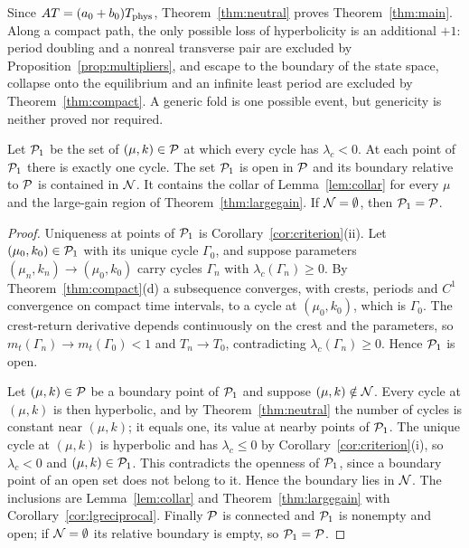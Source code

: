 Since $AT=(a_0+b_0)T_{\rm phys}$, Theorem~\ref{thm:neutral} proves Theorem~\ref{thm:main}. Along a compact path, the only possible loss of hyperbolicity is an additional $+1$: period doubling and a nonreal transverse pair are excluded by Proposition~\ref{prop:multipliers}, and escape to the boundary of the state space, collapse onto the equilibrium and an infinite least period are excluded by Theorem~\ref{thm:compact}. A generic fold is one possible event, but genericity is neither proved nor required.

\begin{corollary}\label{obs:cor:uniqueset}
Let $\mathcal P_1$ be the set of $(\mu,k)\in\mathcal P$ at which every cycle has $\lambda_c<0$. At each point of $\mathcal P_1$ there is exactly one cycle. The set $\mathcal P_1$ is open in $\mathcal P$ and its boundary relative to $\mathcal P$ is contained in $\mathcal N$. It contains the collar of Lemma~\ref{lem:collar} for every $\mu$ and the large-gain region of Theorem~\ref{thm:largegain}. If $\mathcal N=\emptyset$, then $\mathcal P_1=\mathcal P$.
\end{corollary}
\begin{proof}
Uniqueness at points of $\mathcal P_1$ is Corollary~\ref{cor:criterion}(ii). Let $(\mu_0,k_0)\in\mathcal P_1$ with its unique cycle $\Gamma_0$, and suppose parameters $(\mu_n,k_n)\to(\mu_0,k_0)$ carry cycles $\Gamma_n$ with $\lambda_c(\Gamma_n)\ge0$. By Theorem~\ref{thm:compact}(d) a subsequence converges, with crests, periods and $C^1$ convergence on compact time intervals, to a cycle at $(\mu_0,k_0)$, which is $\Gamma_0$. The crest-return derivative depends continuously on the crest and the parameters, so $m_t(\Gamma_n)\to m_t(\Gamma_0)<1$ and $T_n\to T_0$, contradicting $\lambda_c(\Gamma_n)\ge0$. Hence $\mathcal P_1$ is open.

Let $(\mu,k)\in\mathcal P$ be a boundary point of $\mathcal P_1$ and suppose $(\mu,k)\notin\mathcal N$. Every cycle at $(\mu,k)$ is then hyperbolic, and by Theorem~\ref{thm:neutral} the number of cycles is constant near $(\mu,k)$; it equals one, its value at nearby points of $\mathcal P_1$. The unique cycle at $(\mu,k)$ is hyperbolic and has $\lambda_c\le0$ by Corollary~\ref{cor:criterion}(i), so $\lambda_c<0$ and $(\mu,k)\in\mathcal P_1$. This contradicts the openness of $\mathcal P_1$, since a boundary point of an open set does not belong to it. Hence the boundary lies in $\mathcal N$. The inclusions are Lemma~\ref{lem:collar} and Theorem~\ref{thm:largegain} with Corollary~\ref{cor:lgreciprocal}. Finally $\mathcal P$ is connected and $\mathcal P_1$ is nonempty and open; if $\mathcal N=\emptyset$ its relative boundary is empty, so $\mathcal P_1=\mathcal P$.
\end{proof}

